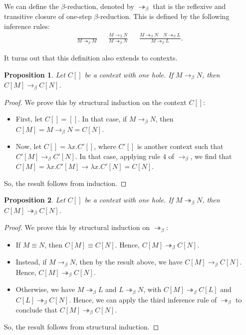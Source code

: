 \documentclass[a4paper, openany]{memoir}
\newtheorem{proposition}{Proposition}[section]
\theoremstyle{definition}
\begin{document}
    We can define the $\beta$-reduction, denoted by $\twoheadrightarrow_\beta$ that is the reflexive and transitive closure of one-step $\beta$-reduction. This is defined by the following inference rules:
    \begin{align*}
        \frac{}{M \twoheadrightarrow_\beta M} && \frac{M \to_\beta N}{M \twoheadrightarrow_\beta N} && \frac{M \twoheadrightarrow_\beta N \quad N \twoheadrightarrow_\beta L}{M \twoheadrightarrow_\beta L}.
    \end{align*}

    It turns out that this definition also extends to contexts.
    \begin{proposition}
        Let $C[]$ be a context with one hole. If $M \to_\beta N$, then $C[M] \to_\beta C[N]$.
    \end{proposition}
    \begin{proof}
        We prove this by structural induction on the context $C[]$:
        \begin{itemize}
            \item First, let $C[] = []$. In that case, if $M \to_\beta N$, then $C[M] = M \to_\beta N = C[N]$.
            \item Now, let $C[] = \lambda x.C'[]$, where $C'[]$ is another context such that $C'[M] \to_\beta C'[N]$. In that case, applying rule 4 of $\to_\beta$, we find that $C[M] = \lambda x.C'[M] \to \lambda x.C'[N] = C[N]$.
        \end{itemize}
        So, the result follows from induction.
    \end{proof}
    \begin{proposition}
        Let $C[]$ be a context with one hole.  If $M \twoheadrightarrow_\beta N$, then $C[M] \twoheadrightarrow_\beta C[N]$.
    \end{proposition}
    \begin{proof}
        We prove this by structural induction on $\twoheadrightarrow_\beta$:
        \begin{itemize}
            \item If $M \equiv N$, then $C[M] \equiv C[N]$. Hence, $C[M] \twoheadrightarrow_\beta C[N]$.
            \item Instead, if $M \to_\beta N$, then by the result above, we have $C[M] \to_\beta C[N]$. Hence, $C[M] \twoheadrightarrow_\beta C[N]$.
            \item Otherwise, we have $M \twoheadrightarrow_\beta L$ and $L \twoheadrightarrow_\beta N$, with $C[M] \twoheadrightarrow_\beta C[L]$ and $C[L] \twoheadrightarrow_\beta C[N]$. Hence, we can apply the third inference rule of $\twoheadrightarrow_\beta$ to conclude that $C[M] \twoheadrightarrow_\beta C[N]$.
        \end{itemize}
        So, the result follows from structural induction.
    \end{proof}
\end{document}

